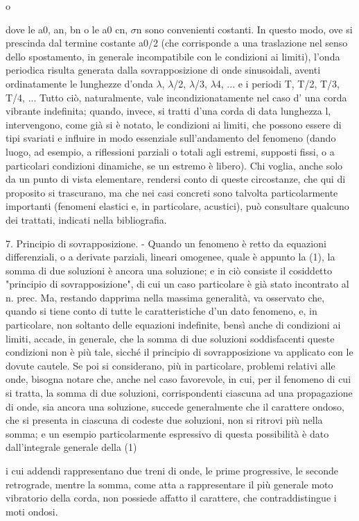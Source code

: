 \documentclass[a4paper]{article}
\begin{document}
o

dove le a0, an, bn o le a0 cn, $\sigma$n sono convenienti costanti. In questo modo, ove si prescinda dal termine costante a0/2 (che corrisponde a una traslazione nel senso dello spostamento, in generale incompatibile con le condizioni ai limiti), l'onda periodica risulta generata dalla sovrapposizione di onde sinusoidali, aventi ordinatamente le lunghezze d'onda $\lambda$, $\lambda$/2, $\lambda$/3, $\lambda$4, ... e i periodi T, T/2, T/3, T/4, ... Tutto ciò, naturalmente, vale incondizionatamente nel caso d' una corda vibrante indefinita; quando, invece, si tratti d'una corda di data lunghezza l, intervengono, come già si è notato, le condizioni ai limiti, che possono essere di tipi svariati e influire in modo essenziale sull'andamento del fenomeno (dando luogo, ad esempio, a riflessioni parziali o totali agli estremi, supposti fissi, o a particolari condizioni dinamiche, se un estremo è libero). Chi voglia, anche solo da un punto di vista elementare, rendersi conto di queste circostanze, che qui di proposito si trascurano, ma che nei casi concreti sono talvolta particolarmente importanti (fenomeni elastici e, in particolare, acustici), può consultare qualcuno dei trattati, indicati nella bibliografia.

7. Principio di sovrapposizione. - Quando un fenomeno è retto da equazioni differenziali, o a derivate parziali, lineari omogenee, quale è appunto la (1), la somma di due soluzioni è ancora una soluzione; e in ciò consiste il cosiddetto "principio di sovrapposizione", di cui un caso particolare è già stato incontrato al n. prec. Ma, restando dapprima nella massima generalità, va osservato che, quando si tiene conto di tutte le caratteristiche d'un dato fenomeno, e, in particolare, non soltanto delle equazioni indefinite, bensì anche di condizioni ai limiti, accade, in generale, che la somma di due soluzioni soddisfacenti queste condizioni non è più tale, sicché il principio di sovrapposizione va applicato con le dovute cautele. Se poi si considerano, più in particolare, problemi relativi alle onde, bisogna notare che, anche nel caso favorevole, in cui, per il fenomeno di cui si tratta, la somma di due soluzioni, corrispondenti ciascuna ad una propagazione di onde, sia ancora una soluzione, succede generalmente che il carattere ondoso, che si presenta in ciascuna di codeste due soluzioni, non si ritrovi più nella somma; e un esempio particolarmente espressivo di questa possibilità è dato dall'integrale generale della (1)

i cui addendi rappresentano due treni di onde, le prime progressive, le seconde retrograde, mentre la somma, come atta a rappresentare il più generale moto vibratorio della corda, non possiede affatto il carattere, che contraddistingue i moti ondosi.
\end{document}
